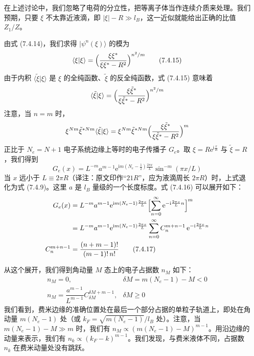 在上述讨论中，我们忽略了电荷的分立性，把等离子体当作连续介质来处理。我们预期，只要 $\xi$ 不太靠近液滴，即 $|\xi|-R\gg l_B$，这一近似就能给出正确的比值 $Z_1/Z$。

由式 (7.4.14)，我们求得 $|\psi^n(\xi)\rangle$ 的模为
\begin{equation*}
\langle\xi|\xi\rangle=\Bigl(\frac{\xi\xi^*}{\xi\xi^*-R^2}\Bigr)^{n^2/m}
\tag{7.4.15}
\end{equation*}
由于内积 $\langle\tilde{\xi}|\xi\rangle$ 是 $\xi$ 的全纯函数、$\tilde{\xi}$ 的反全纯函数，式 (7.4.15) 意味着
\begin{equation*}
\langle\tilde{\xi}|\xi\rangle=\Bigl(\frac{\xi\tilde{\xi}^*}{\xi\tilde{\xi}^*-R^2}\Bigr)^{n^2/m}
\end{equation*}
注意，当 $n=m$ 时，
\begin{equation*}
\xi^{Nm}\tilde{\xi}^{*Nm}\langle\tilde{\xi}|\xi\rangle=\xi^{Nm}\tilde{\xi}^{*Nm}\Bigl(\frac{\xi\tilde{\xi}^*}{\xi\tilde{\xi}^*-R^2}\Bigr)^m
\end{equation*}
正比于 $N_e=N+1$ 电子系统边缘上等时的电子传播子 $G_e$。取 $\xi=R\mathrm{e}^{\mathrm{i}\frac{x}{R}}$ 与 $\tilde{\xi}=R$，我们得到
\begin{equation*}
G_e(x)=L^{-m}a^{m-1}\mathrm{e}^{\mathrm{i}m\left(N_e-\frac{1}{2}\right)\frac{2\pi x}{L}}\sin^{-m}(\pi x/L)
\tag{7.4.16}
\end{equation*}
当 $x$ 远小于 $L\equiv2\pi R$（译注：原文印作“$21R$”，应为液滴周长 $2\pi R$）时，上式退化为式 (7.4.9)。这里 $a$ 是 $l_B$ 量级的一个长度标度。式 (7.4.16) 可以展开如下：
\begin{align*}
G_e(x)&=L^{-m}a^{m-1}\mathrm{e}^{\mathrm{i}m(N_e-1)\frac{2\pi x}{L}}\Bigl[\sum_{n=0}^{\infty}\mathrm{e}^{-\mathrm{i}\frac{2\pi x}{L}n}\Bigr]^m\notag\\
&=L^{-m}a^{m-1}\mathrm{e}^{\mathrm{i}m(N_e-1)\frac{2\pi x}{L}}\sum_{n=0}^{\infty}C_n^{m+n-1}\,\mathrm{e}^{-\mathrm{i}\frac{2\pi x}{L}n}\\
C_n^{m+n-1}&=\frac{(n+m-1)!}{(m-1)!\,n!}\tag{7.4.17}
\end{align*}

从这个展开，我们得到角动量 $M$ 态上的电子占据数 $n_M$ 如下：
\begin{equation*}
\begin{array}{ll}
n_M=0, & \delta M=m(N_e-1)-M<0\\[4pt]
n_M=\dfrac{a^{m-1}}{L^{m-1}}C_{\delta M}^{\delta M+m-1}, & \delta M\geqslant0
\end{array}
\tag{7.4.18}
\end{equation*}
我们看到，费米边缘的准确位置处在最后一个部分占据的单粒子轨道上，即处在角动量 $m(N_e-1)$ 处（或 $k_F=\sqrt{m(N_e-1)}/l_B$ 处）。注意，当 $m(N_e-1)-M\gg m$ 时，我们有 $n_M\propto(m(N_e-1)-M)^{m-1}$。用沿边缘的动量来表示，我们有 $n_k\propto(k_F-k)^{m-1}$。我们发现，与费米液体不同，占据数 $n_k$ 在费米动量处没有跳跃。

